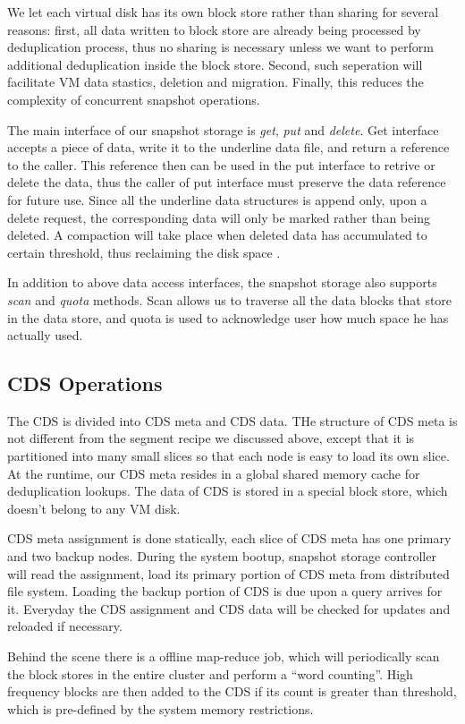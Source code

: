 We let each virtual disk has its own block store rather than sharing for several reasons:
first, all data written to block store are already being processed by deduplication
process, thus no sharing is necessary unless we want to perform additional deduplication
inside the block store. Second, such seperation will facilitate VM data stastics, 
deletion and migration. Finally, this reduces the complexity of concurrent snapshot operations.

The main interface of our snapshot storage is \emph{get}, \emph{put} and \emph{delete}.
Get interface accepts a piece of data, write it to the underline data file, and return
a reference to the caller. This reference then can be used in the put interface to
retrive or delete the data, thus the caller of put interface must preserve the
data reference for future use. Since all the underline data structures is append only,
upon a delete request, the corresponding data will only be marked rather than being deleted.
A compaction will take place when deleted data has accumulated to certain threshold, thus 
reclaiming the disk space .

In addition to above data access interfaces, the snapshot storage also supports
\emph{scan} and \emph{quota} methods. Scan allows us to traverse all the data blocks
that store in the data store, and quota is used to acknowledge user how much space he
has actually used.

\subsection{CDS Operations}
The CDS is divided into CDS meta and CDS data. THe structure of CDS meta is not different from the
segment recipe we discussed above, except that it is partitioned into many small slices so that each node
is easy to load its own slice. At the runtime, our CDS meta resides in a global shared memory cache for 
deduplication lookups. The data of CDS is stored in a special block store, which doesn't belong to any VM disk.

CDS meta assignment is done statically, each slice of CDS meta has one primary and two backup nodes.
During the system bootup, snapshot storage controller will read the assignment, 
load its primary portion of CDS meta from distributed file system. Loading the backup portion
of CDS is due upon a query arrives for it. Everyday the CDS assignment and CDS data will be checked
 for updates and reloaded if necessary.

Behind the scene there is a offline map-reduce job, which will periodically scan the block stores
in the entire cluster and perform a ``word counting''. High frequency blocks are then added to the CDS if its count 
 is greater than threshold, which is pre-defined by the system memory restrictions.

